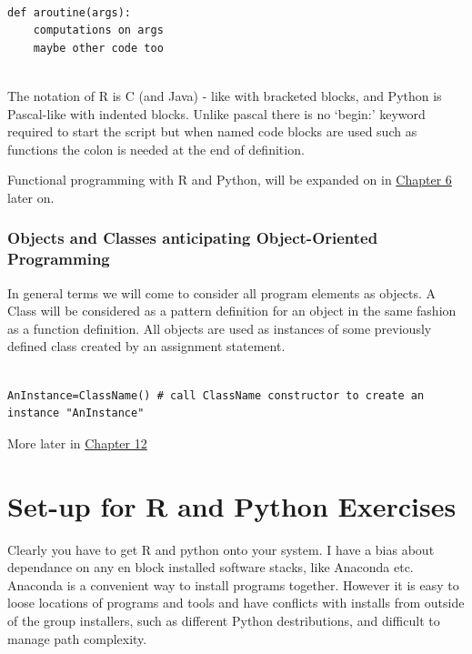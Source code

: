 \documentclass[]{book}
\theoremstyle{definition}
\theoremstyle{definition}
\theoremstyle{definition}
\theoremstyle{remark}
\begin{document}
\begin{verbatim}

def aroutine(args):
    computations on args
    maybe other code too
  
\end{verbatim}

The notation of R is C (and Java) - like with bracketed blocks, and
Python is Pascal-like with indented blocks. Unlike pascal there is no
`begin:' keyword required to start the script but when named code blocks
are used such as functions the colon is needed at the end of definition.

Functional programming with R and Python, will be expanded on in
\href{06-Functional_Programming.Rmd}{Chapter 6} later on.

\subsection{Objects and Classes anticipating Object-Oriented
Programming}\label{objects-and-classes-anticipating-object-oriented-programming}

In general terms we will come to consider all program elements as
objects. A Class will be considered as a pattern definition for an
object in the same fashion as a function definition. All objects are
used as instances of some previously defined class created by an
assignment statement.

\begin{verbatim}

AnInstance=ClassName() # call ClassName constructor to create an instance "AnInstance"

\end{verbatim}

More later in \href{12-OO_Programming.Rmd}{Chapter 12}

\chapter{Set-up for R and Python
Exercises}\label{set-up-for-r-and-python-exercises}

Clearly you have to get R and python onto your system. I have a bias
about dependance on any en block installed software stacks, like
Anaconda etc. Anaconda is a convenient way to install programs together.
However it is easy to loose locations of programs and tools and have
conflicts with installs from outside of the group installers, such as
different Python destributions, and difficult to manage path complexity.
\end{document}
